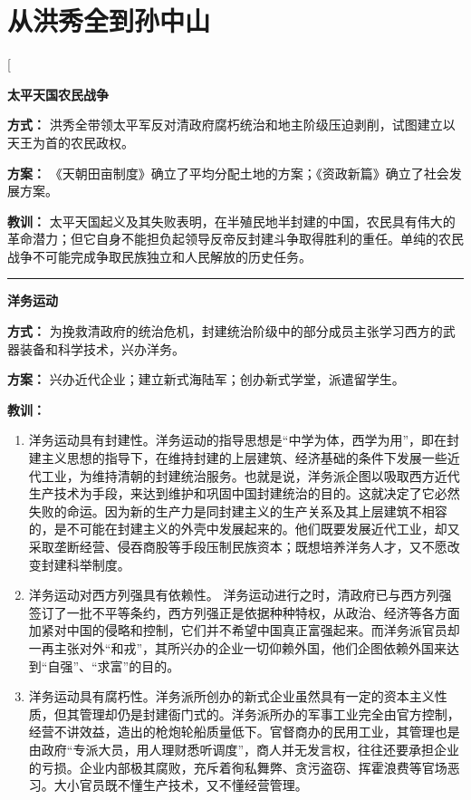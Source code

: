 ﻿
\section{从洪秀全到孙中山}
\begin{enumerate}
	\ans[
		{\begin{center}\textbf{太平天国农民战争}\end{center}}
		\textbf{方式：} 洪秀全带领太平军反对清政府腐朽统治和地主阶级压迫剥削，试图建立以天王为首的农民政权。\par
		\textbf{方案：} 《天朝田亩制度》确立了平均分配土地的方案；《资政新篇》确立了社会发展方案。\par
		\textbf{教训：} 太平天国起义及其失败表明，在半殖民地半封建的中国，农民具有伟大的革命潜力；但它自身不能担负起领导反帝反封建斗争取得胜利的重任。单纯的农民战争不可能完成争取民族独立和人民解放的历史任务。\par
		\bigskip
		\hrule
		\bigskip
		{\begin{center}\textbf{洋务运动}\end{center}}\par
			\textbf{方式：} 为挽救清政府的统治危机，封建统治阶级中的部分成员主张学习西方的武器装备和科学技术，兴办洋务。\par
			\textbf{方案：}  兴办近代企业；建立新式海陆军；创办新式学堂，派遣留学生。\par
			\textbf{教训：} \begin{enumerate}
				\item 洋务运动具有封建性。洋务运动的指导思想是“中学为体，西学为用”，即在封建主义思想的指导下，在维持封建的上层建筑、经济基础的条件下发展一些近代工业，为维持清朝的封建统治服务。也就是说，洋务派企图以吸取西方近代生产技术为手段，来达到维护和巩固中国封建统治的目的。这就决定了它必然失败的命运。因为新的生产力是同封建主义的生产关系及其上层建筑不相容的，是不可能在封建主义的外壳中发展起来的。他们既要发展近代工业，却又采取垄断经营、侵吞商股等手段压制民族资本；既想培养洋务人才，又不愿改变封建科举制度。
				\item 洋务运动对西方列强具有依赖性。 洋务运动进行之时，清政府已与西方列强签订了一批不平等条约，西方列强正是依据种种特权，从政治、经济等各方面加紧对中国的侵略和控制，它们并不希望中国真正富强起来。而洋务派官员却一再主张对外“和戎”，其所兴办的企业一切仰赖外国，他们企图依赖外国来达到“自强”、“求富”的目的。
				\item 洋务运动具有腐朽性。洋务派所创办的新式企业虽然具有一定的资本主义性质，但其管理却仍是封建衙门式的。洋务派所办的军事工业完全由官方控制，经营不讲效益，造出的枪炮轮船质量低下。官督商办的民用工业，其管理也是由政府“专派大员，用人理财悉听调度”，商人并无发言权，往往还要承担企业的亏损。企业内部极其腐败，充斥着徇私舞弊、贪污盗窃、挥霍浪费等官场恶习。大小官员既不懂生产技术，又不懂经营管理。\end{enumerate}\par

\end{enumerate}
